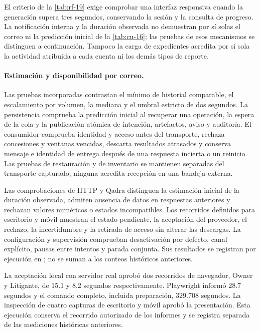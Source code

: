 El criterio de la \cref{tab:rf-19} exige comprobar una interfaz responsiva
cuando la generación supera tres segundos, conservando la sesión y la consulta
de progreso. La notificaci\'on interna y la duraci\'on observada no demuestran
por s\'i solas el correo ni la predicci\'on inicial de la \cref{tab:cu-16}; las
pruebas de esos mecanismos se distinguen a continuaci\'on. Tampoco la carga de
expedientes acredita por s\'i sola la actividad atribuida a cada cuenta ni los
dem\'as tipos de reporte.

\paragraph{Estimaci\'on y disponibilidad por correo.}
Las pruebas incorporadas contrastan el m\'inimo de historial comparable, el
escalamiento por volumen, la mediana y el umbral estricto de dos segundos.
La persistencia comprueba la predicci\'on inicial al recuperar una operaci\'on,
la espera de la cola y la publicaci\'on at\'omica de intenci\'on, artefactos, aviso
y auditor\'ia. El consumidor comprueba identidad y acceso antes del transporte,
rechaza concesiones y ventanas vencidas, descarta resultados atrasados y conserva mensaje
e identidad de entrega despu\'es de una respuesta incierta o un reinicio.
Las pruebas de restauraci\'on y de inventario se mantienen separadas del
transporte capturado; ninguna acredita recepci\'on en una bandeja externa.

Las comprobaciones de HTTP y Qadra distinguen la estimaci\'on inicial de la
duraci\'on observada, admiten ausencia de datos en respuestas anteriores y
rechazan valores num\'ericos o estados incompatibles. Los recorridos definidos
para escritorio y m\'ovil muestran el estado pendiente, la aceptaci\'on del
proveedor, el rechazo, la incertidumbre y la retirada de acceso sin alterar
las descargas. La configuraci\'on y supervisi\'on comprueban desactivaci\'on por
defecto, canal expl\'icito, pausas entre intentos y parada conjunta. Sus resultados
se registran por ejecuci\'on en ; no se
suman a los conteos hist\'oricos anteriores.

La aceptaci\'on local con servidor real aprob\'o dos recorridos de navegador,
Owner y Litigante, de 15.1 y 8.2 segundos respectivamente. Playwright inform\'o
28.7 segundos y el comando completo, incluida preparaci\'on, 329.708 segundos.
La inspecci\'on de cuatro capturas de escritorio y m\'ovil aprob\'o la presentaci\'on.
Esta ejecuci\'on conserva el recorrido autorizado de los informes y se registra
separada de las mediciones hist\'oricas anteriores.

